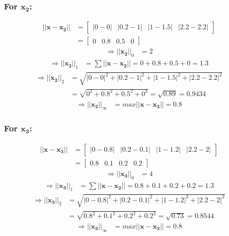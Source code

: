 \subsubsection{For $\mathbf{x_2}$:}
\begin{align}
    ||\mathbf{x} - \mathbf{x_2}|| &= 
    \begin{bmatrix}
        |0 - 0| & |0.2 - 1| & |1 - 1.5| & |2.2 - 2.2|
    \end{bmatrix} \nonumber \\
    &= 
    \begin{bmatrix}
        0 & 0.8 & 0.5 & 0
    \end{bmatrix} 
\end{align}
\begin{align}
    \Rightarrow ||\mathbf{x_2}||_0 &= 2
\end{align}
\begin{align}
    \Rightarrow  ||\mathbf{x_2}||_1 &= \sum ||\mathbf{x} - \mathbf{x_2}|| = 0 + 0.8 + 0.5 + 0 = 1.3
\end{align}
\begin{align}
    \Rightarrow ||\mathbf{x_2}||_2 &= \sqrt{|0 - 0|^2 + |0.2 - 1|^2 + |1 - 1.5|^2 + |2.2 - 2.2|^2} \nonumber \\
    &= \sqrt{0^2 + 0.8^2 + 0.5^2 + 0^2} = \sqrt{0.89} = 0.9434
\end{align}
\begin{align}
    \Rightarrow ||\mathbf{x_2}||_{\infty} &= max ||\mathbf{x} - \mathbf{x_2}|| = 0.8
\end{align}

\subsubsection{For $\mathbf{x_3}$:}
\begin{align}
    ||\mathbf{x} - \mathbf{x_3}|| &= 
    \begin{bmatrix}
        |0 - 0.8| & |0.2 - 0.1| & |1 - 1.2| & |2.2 - 2|
    \end{bmatrix} \nonumber \\
    &= 
    \begin{bmatrix}
        0.8 & 0.1 & 0.2 & 0.2
    \end{bmatrix} 
\end{align}
\begin{align}
    \Rightarrow ||\mathbf{x_3}||_0 &= 4
\end{align}
\begin{align}
    \Rightarrow  ||\mathbf{x_3}||_1 &= \sum ||\mathbf{x} - \mathbf{x_2}|| = 0.8 + 0.1 + 0.2 + 0.2 = 1.3
\end{align}
\begin{align}
    \Rightarrow ||\mathbf{x_3}||_2 &= \sqrt{|0 - 0.8|^2 + |0.2 - 0.1|^2 + |1 - 1.2|^2 + |2.2 - 2|^2} \nonumber \\
    &= \sqrt{0.8^2 + 0.1^2 + 0.2^2 + 0.2^2} = \sqrt{0.73} = 0.8544
\end{align}
\begin{align}
    \Rightarrow ||\mathbf{x_3}||_{\infty} &= max ||\mathbf{x} - \mathbf{x_3}|| = 0.8
\end{align}

